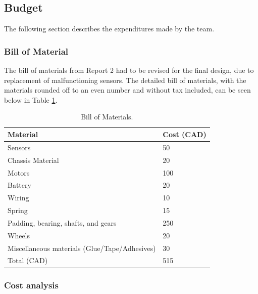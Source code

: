 \documentclass[ece]{uw-wkrpt}
\begin{document}
\subsection{Budget}

The following section describes the expenditures made by the team.

\subsubsection{Bill of Material}

The bill of materials from Report 2 had to be revised for the final design, due to replacement of malfunctioning sensors. The detailed bill of materials, with the materials rounded off to an even number and without tax included, can be seen below in Table \ref{tab:billOfMaterials}.

\begin{table}[!htb]
  \centering
    \caption[Bill of materials]
    {Bill of Materials.}
    \begin{tabular}{ | l | l | }
        \hline
        Material  & \cellcolor{mygray}Cost (CAD)  \\ \hline 
        \cellcolor{mygray} Sensors  & 50 \\ \hline
        \cellcolor{mygray} Chassis Material  & 20 \\ \hline
        \cellcolor{mygray} Motors  & 100 \\ \hline
        \cellcolor{mygray} Battery  & 20 \\ \hline
        \cellcolor{mygray} Wiring  & 10 \\ \hline
        \cellcolor{mygray} Spring  & 15 \\ \hline
        \cellcolor{mygray} Padding, bearing, shafts, and gears  & 250 \\ \hline
        \cellcolor{mygray} Wheels  & 20 \\ \hline
        \cellcolor{mygray} Miscellaneous materials (Glue/Tape/Adhesives)  & 30 \\ \hline
        \cellcolor{mygray} Total (CAD)  & 515 \\ \hline
  \end{tabular}
  \label{tab:billOfMaterials}
\end{table}

\subsubsection{Cost analysis}
\end{document}
